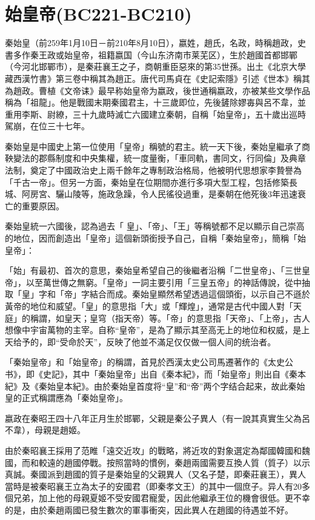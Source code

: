 
\section{始皇帝\tiny(BC221-BC210)}

秦始皇（前259年1月10日－前210年8月10日），嬴姓，趙氏，名政，時稱趙政，史書多作秦王政或始皇帝，祖籍嬴国（今山东济南市莱芜区），生於趙國首都邯鄲（今河北邯鄲市），是秦莊襄王之子，商朝重臣惡來的第35世孫。出土《北京大學藏西漢竹書》第三卷中稱其為趙正。唐代司馬貞在《史記索隱》引述《世本》稱其為趙政。曹植《文帝诔》最早称始皇帝为嬴政，後世通稱嬴政，亦被某些文學作品稱為「祖龍」。他是戰國末期秦國君主，十三歲即位，先後鏟除嫪毐與呂不韋，並重用李斯、尉繚，三十九歲時滅亡六國建立秦朝，自稱「始皇帝」，五十歲出巡時駕崩，在位三十七年。

秦始皇是中國史上第一位使用「皇帝」稱號的君主。統一天下後，秦始皇繼承了商鞅變法的郡縣制度和中央集權，統一度量衡，「車同軌，書同文，行同倫」及典章法制，奠定了中國政治史上兩千餘年之專制政治格局，他被明代思想家李贄譽為「千古一帝」。但另一方面，秦始皇在位期間亦進行多項大型工程，包括修築長城、阿房宮、驪山陵等，施政急躁，令人民徭役過重，是秦朝在他死後3年迅速衰亡的重要原因。

秦始皇統一六國後，認為過去「 皇」、「帝」、「王」等稱號都不足以顯示自己崇高的地位，因而創造出「皇帝」這個新頭銜授予自己，自稱「秦始皇帝」，簡稱「始皇帝」：

「始」有最初、首次的意思，秦始皇希望自己的後繼者沿稱「二世皇帝」、「三世皇帝」，以至萬世傳之無窮。「皇帝」一詞主要引用「三皇五帝」的神話傳說，從中抽取「皇」字和「帝」字結合而成。秦始皇顯然希望透過這個頭銜，以示自己不遜於黃帝的地位和威望。「皇」的意思指「大」或「輝煌」，通常是古代中國人對「天庭」的稱謂，如皇天；皇穹（指天帝）等。「帝」的意思指「天帝」、「上帝」，古人想像中宇宙萬物的主宰。自称“皇帝”，是為了顯示其至高无上的地位和权威，是上天给予的，即“受命於天”，反映了他並不滿足仅仅做一個人间的统治者。

「秦始皇帝」和「始皇帝」的稱謂，首見於西漢太史公司馬遷著作的《太史公书》，即《史記》，其中「秦始皇帝」出自《秦本紀》，而「始皇帝」則出自《秦本紀》及《秦始皇本紀》。由於秦始皇首度将“皇”和“帝”两个字结合起来，故此秦始皇的正式稱謂應為「秦始皇帝」。

嬴政在秦昭王四十八年正月生於邯鄲，父親是秦公子異人（有一說其真實生父為呂不韋），母親是趙姬。

由於秦昭襄王採用了范睢「遠交近攻」的戰略，將近攻的對象選定為鄰國韓國和魏國，而和較遠的趙國停戰。按照當時的慣例，秦趙兩國需要互換人質（質子）以示真誠。秦國派到趙國的質子是秦始皇的父親異人（又名子楚，即秦莊襄王），異人當時是被秦昭襄王立為太子的安國君（即秦孝文王）的其中一個庶子。异人有20多個兄弟，加上他的母親夏姬不受安國君寵愛，因此他繼承王位的機會很低。更不幸的是，由於秦趙兩國已發生數次的軍事衝突，因此異人在趙國的待遇並不好。


